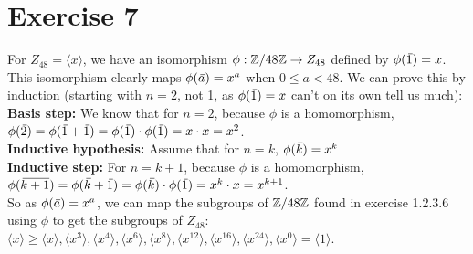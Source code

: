 \documentclass[12pt]{article}
\begin{document}
    \section*{Exercise 7}
    For $Z_{48} = \langle x \rangle$,
    we have an isomorphism $\phi: \mathbb{Z}/48\mathbb{Z} \to Z_{48}$
    defined by $\phi(\,\overline{\!{1}}) = x$. \\
    This isomorphism clearly maps $\phi(\,\overline{\!{a}}) = x^a$
    when $0 \leqslant a < 48$.
    We can prove this by induction
    (starting with $n = 2$, not 1, as
    $\phi(\,\overline{\!{1}}) = x$ can't on its own tell us much): \\
    \textbf{Basis step:}
    We know that for $n = 2$,
    because $\phi$ is a homomorphism,
    $\phi(\,\overline{\!{2}}) = \phi(\,\overline{\!{1}} + \,\overline{\!{1}})
    = \phi(\,\overline{\!{1}}) \cdot \phi(\,\overline{\!{1}}) = x \cdot x = x^2$. \\
    \textbf{Inductive hypothesis:}
    Assume that for $n = k$, $\phi(\,\overline{\!{k}}) = x^k$ \\ 
    \textbf{Inductive step:}
    For $n = k + 1$, because $\phi$ is a homomorphism,
    $\phi(\,\overline{\!{k + 1}}) = \phi(\,\overline{\!{k}} + \,\overline{\!{1}})
    = \phi(\,\overline{\!{k}}) \cdot \phi(\,\overline{\!{1}}) = x^k \cdot x = x^{k+1}$. \\
    So as $\phi(\,\overline{\!{a}}) = x^a$,
    we can map the subgroups of $\mathbb{Z}/48\mathbb{Z}$ found in exercise 1.2.3.6
    using $\phi$ to get the subgroups of $Z_48$: \\
    $\langle x \rangle \geqslant
    \langle x \rangle,
    \langle x^3 \rangle,
    \langle x^4 \rangle,
    \langle x^6 \rangle,
    \langle x^8 \rangle,
    \langle x^{12} \rangle,
    \langle x^{16} \rangle,
    \langle x^{24} \rangle,
    \langle x^0 \rangle = \langle 1 \rangle$.
    
\end{document}
